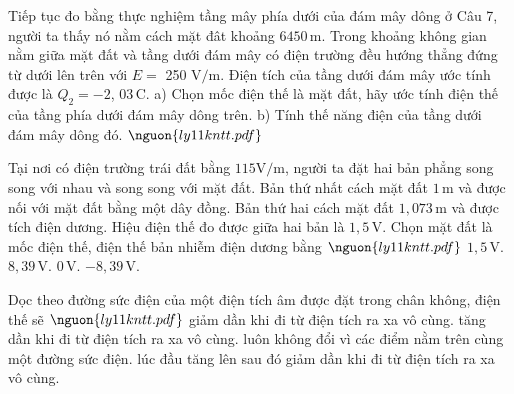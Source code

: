 \begin{bt}
Tiếp tục đo bằng thực nghiệm tầng mây phía dưới của đám mây dông ở Câu 7, người ta thấy nó nằm cách mặt đât khoảng $6450\,\text{m}$. Trong khoảng không gian nằm giữa mặt đất và tầng dưới đám mây có điện trường đều hướng thẳng đứng từ dưới lên trên với $E =$ 250 $\mathrm{V/m}$. Điện tích của tầng dưới đám mây ước tính được là $Q_2 = -2$, $03\,\mathrm{C}$. a) Chọn mốc điện thế là mặt đất, hãy ước tính điện thế của tầng phía dưới đám mây dông trên. b) Tính thế năng điện của tầng dưới đám mây dông đó. $\nguon{ly11 kntt.pdf}$
\end{bt}

\begin{ex}
Tại nơi có điện trường trái đất bằng $115 \mathrm{V/m}$, người ta đặt hai bản phẳng song song với nhau và song song với mặt đất. Bản thứ nhất cách mặt đất $1\,\text{m}$ và được nối với mặt đất bằng một dây đồng. Bản thứ hai cách mặt đất $1,073\,\text{m}$ và được tích điện dương. Hiệu điện thế đo được giữa hai bản là $1,5\,\mathrm{V}$. Chọn mặt đất là mốc điện thế, điện thế bản nhiễm điện dương bằng $\nguon{ly11 kntt.pdf}$
\choice
{\True $1,5\,\mathrm{V}$.}
{$8,39\,\mathrm{V}$.}
{$0\,\mathrm{V}$.}
{$-8,39\,\mathrm{V}$.}
\end{ex}

\begin{ex}
Dọc theo đường sức điện của một điện tích âm được đặt trong chân không, điện thế sẽ $\nguon{ly11 kntt.pdf}$
\choice
{giảm dần khi đi từ điện tích ra xa vô cùng.}
{\True tăng dần khi đi từ điện tích ra xa vô cùng.}
{luôn không đổi vì các điểm nằm trên cùng một đường sức điện.}
{lúc đầu tăng lên sau đó giảm dần khi đi từ điện tích ra xa vô cùng.}
\end{ex}
